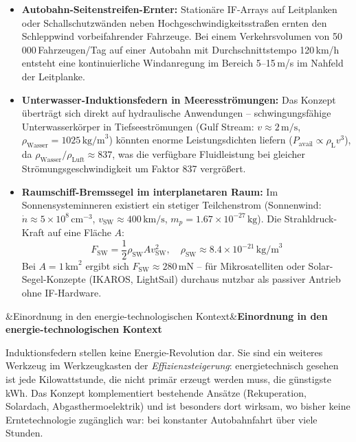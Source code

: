 ﻿\documentclass[12pt, a4paper]{report}
\newenvironment{hinweis}[1][]{%
  \begin{hinweisframe}\sloppy%
  \ifx&#1&\else\textbf{#1}\par\smallskip\fi}{\end{hinweisframe}}
\theoremstyle{definition}
\theoremstyle{remark}
\newcommand{\rhoL}{\rho_{\text{L}}}
\begin{document}
\begin{itemize}
  \item \textbf{Autobahn-Seitenstreifen-Ernter:} Stationäre IF-Arrays auf
        Leitplanken oder Schallschutzwänden neben Hochgeschwindigkeitsstraßen
        ernten den Schlepp\-wind vorbeifahrender Fahrzeuge. Bei einem
        Verkehrsvolumen von 50\,000\,Fahr\-zeugen/Tag auf einer Autobahn
        mit Durchschnitts\-tempo 120\,km/h entsteht eine kontinuierliche
        Windanregung im Bereich 5--15\,m/s im Nahfeld der Leitplanke.

  \item \textbf{Unterwasser-Induktionsfedern in Meeresströmungen:} Das
        Konzept überträgt sich direkt auf hydraulische Anwendungen --
        schwingungsfähige Unterwasserkörper in Tiefseest\-römungen
        (Gulf Stream: $v \approx 2\,\text{m/s}$, $\rho_{\text{Wasser}} = 1025\,\text{kg/m}^3$)
        könnten enorme Leistungsdichten liefern ($P_{\text{avail}} \propto \rhoL v^3$),
        da $\rho_{\text{Wasser}}/\rho_{\text{Luft}} \approx 837$, was die
        verfügbare Fluidleistung bei gleicher Strömungsgeschwindigkeit
        um Faktor 837 vergrößert.

  \item \textbf{Raumschiff-Bremssegel im interplanetaren Raum:}
        Im Sonnensysteminneren existiert ein stetiger Teilchenstrom
        (Sonnenwind: $\dot{n} \approx 5 \times 10^8\,\text{cm}^{-3}$,
        $v_{\text{SW}} \approx 400\,\text{km/s}$, $m_p = 1.67 \times 10^{-27}\,\text{kg}$).
        Die Strahldruck-Kraft auf eine Fläche $A$:
        \begin{equation}
          F_{\text{SW}} = \frac{1}{2}\rho_{\text{SW}} A v_{\text{SW}}^2,
          \quad \rho_{\text{SW}} \approx 8.4 \times 10^{-21}\,\text{kg/m}^3
        \end{equation}
        Bei $A = 1\,\text{km}^2$ ergibt sich $F_{\text{SW}} \approx 280\,\text{mN}$ --
        für Mikrosatelliten oder Solar-Segel-Konzepte (IKAROS, LightSail)
        durchaus nutzbar als passiver Antrieb ohne IF-Hardware.
\end{itemize}

\begin{hinweis}[Einordnung in den energie-technologischen Kontext]
  Induktionsfedern stellen keine Energie-Revolution dar. Sie sind ein
  weiteres Werkzeug im Werkzeugkasten der \emph{Effizienzsteigerung}:
  energie\-technisch gesehen ist jede Kilowattstunde, die nicht primär
  erzeugt werden muss, die günstigste kWh. Das Konzept komplementiert
  bestehende Ansätze (Rekuperation, Solardach, Abgasthermoelektrik)
  und ist besonders dort wirksam, wo bisher keine Ernte\-technologie
  zugänglich war: bei konstanter Autobahnfahrt über viele Stunden.
\end{hinweis}
\end{document}
